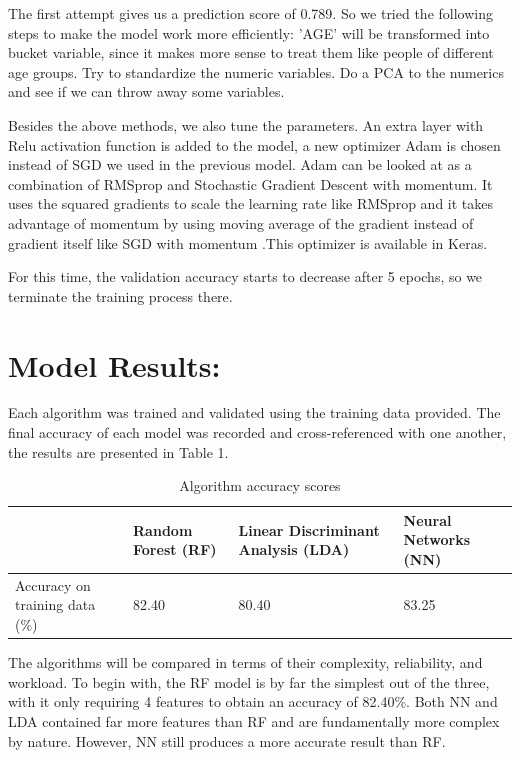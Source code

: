\documentclass{article}
\begin{document}
The first attempt gives us a prediction score of 0.789. So we tried the following steps to make the model work more efficiently:
'AGE' will be transformed into bucket variable, since it makes more sense to treat them like people of different age groups.
Try to standardize the numeric variables.
Do a PCA to the numerics and see if we can throw away some variables.

Besides the above methods, we also tune the parameters. An extra layer with Relu activation function is added to the model, a new optimizer Adam is chosen instead of SGD we used in the previous model. Adam can be looked at as a combination of RMSprop and Stochastic Gradient Descent with momentum. It uses the squared gradients to scale the learning rate like RMSprop and it takes advantage of momentum by using moving average of the gradient instead of gradient itself like SGD with momentum\cite{adam} .This optimizer is available in Keras\cite{optimizer}.

For this time, the validation accuracy starts to decrease after 5 epochs, so we terminate the training process there.


\section{Model Results:}
Each algorithm was trained and validated using the training data provided. The final accuracy of each model was recorded and cross-referenced with one another, the results are presented in Table 1.
\begin{table}[h]
\centering
\begin{tabular}{ |p{3cm}|p{3cm}|p{3cm}|p{3cm}|  }
 \hline
 &Random Forest (RF)&Linear Discriminant Analysis (LDA)&Neural Networks (NN)\\
 \hline
 Accuracy on training data (\%) & 82.40 & 80.40 & 83.25\\
 \hline
\end{tabular}
\caption{Algorithm accuracy scores}
\end{table}
The algorithms will be compared in terms of their complexity, reliability, and workload. To begin with, the RF model is by far the simplest out of the three, with it only requiring 4 features to obtain an accuracy of 82.40\%. Both NN and LDA contained far more features than RF and are fundamentally more complex by nature. However, NN still produces a more accurate result than RF. \\ \\
\end{document}
